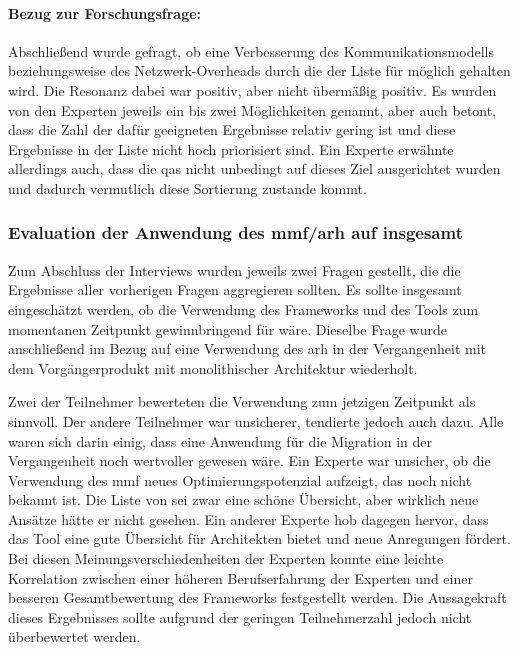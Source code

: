 \paragraph{Bezug zur Forschungsfrage:} Abschließend wurde gefragt, ob eine Verbesserung des Kom\-mu\-ni\-ka\-ti\-ons\-mo\-dells beziehungsweise des Netzwerk-Overheads durch die \bpp der Liste für möglich gehalten wird.
Die Resonanz dabei war positiv, aber nicht übermäßig positiv.
Es wurden von den Experten jeweils ein bis zwei Möglichkeiten genannt, aber auch betont, dass die Zahl der dafür geeigneten Ergebnisse relativ gering ist und diese Ergebnisse in der Liste nicht hoch priorisiert sind.
Ein Experte erwähnte allerdings auch, dass die \glspl{qa} nicht unbedingt auf dieses Ziel ausgerichtet wurden und dadurch vermutlich diese Sortierung zustande kommt.

\subsubsection{Evaluation der Anwendung des \gls{mmf}/\gls{arh} auf \jf insgesamt}
\label{sec:evaluation-mmf-anwendung-insgesamt}

Zum Abschluss der Interviews wurden jeweils zwei Fragen gestellt, die die Ergebnisse aller vor\-he\-ri\-gen Fragen aggregieren sollten.
Es sollte insgesamt eingeschätzt werden, ob die Verwendung des Frameworks und des Tools zum momentanen Zeitpunkt gewinnbringend für \jf wäre.
Dieselbe Frage wurde anschließend im Bezug auf eine Verwendung des \gls{arh} in der Vergangenheit mit dem Vorgängerprodukt mit monolithischer Architektur wiederholt.

Zwei der Teilnehmer bewerteten die Verwendung zum jetzigen Zeitpunkt als sinnvoll.
Der andere Teilnehmer war unsicherer, tendierte jedoch auch dazu.
Alle waren sich darin einig, dass eine Anwendung für die Migration in der Vergangenheit noch wertvoller gewesen wäre.
Ein Experte war unsicher, ob die Verwendung des \gls{mmf} neues Optimierungspotenzial aufzeigt, das noch nicht bekannt ist.
Die Liste von \bpp sei zwar eine schöne Übersicht, aber wirklich neue Ansätze hätte er nicht gesehen.
Ein anderer Experte hob dagegen hervor, dass das Tool eine gute Übersicht für Architekten bietet und neue Anregungen fördert.
Bei diesen Meinungsverschiedenheiten der Experten konnte eine leichte Korrelation zwischen einer höheren Berufserfahrung der Experten und einer besseren Gesamtbewertung des Frameworks festgestellt werden.
Die Aussagekraft dieses Ergebnisses sollte aufgrund der geringen Teilnehmerzahl jedoch nicht überbewertet werden.

